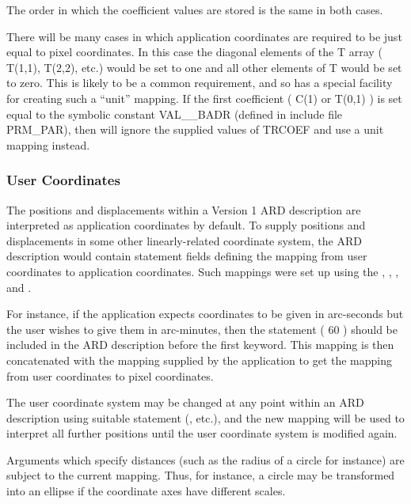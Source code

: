 \documentclass[11pt]{starlink}
\begin{document}
The order in which the coefficient values are stored is the same in both
cases.

There will be many cases in which application coordinates are required to be
just equal to pixel coordinates. In this case the diagonal elements of the T
array ( T(1,1), T(2,2), etc.) would be set to one and all other elements of T
would be set to zero. This is likely to be a common requirement, and so
 has a special facility for creating such a ``unit'' mapping. If the
first coefficient ( C(1) or T(0,1) ) is set equal to the symbolic constant
VAL\_\_BADR (defined in include file PRM\_PAR), then  will ignore the
supplied values of TRCOEF and use a unit mapping instead.

\subsubsection{User Coordinates}
The positions and displacements within a Version 1 ARD description are
interpreted as
application coordinates by default. To supply positions
and displacements in some other linearly-related coordinate system, the ARD
description would contain statement fields defining the mapping from user
coordinates to application coordinates. Such mappings were set up using the
,
,
,
 and
.

For instance, if the application expects coordinates to be given in
arc-seconds but the user wishes to give them in arc-minutes, then the
statement ( 60 ) should be included in the ARD
description before the first keyword. This mapping is then concatenated
with the mapping supplied by the application to get the mapping from user
coordinates to pixel coordinates.

The user coordinate system may be changed at any point within an ARD
description using suitable statement (, etc.),
and the new mapping will be used to interpret all further positions until
the user coordinate system is modified again.

Arguments which specify distances (such as the radius of a circle for instance)
are subject to the current mapping. Thus, for instance, a circle may be
transformed into an ellipse if the coordinate axes have different scales.
\end{document}
